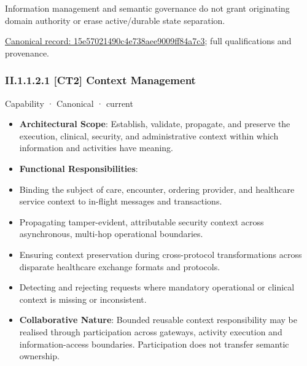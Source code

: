 Information management and semantic governance do not grant originating domain authority or erase active/durable state separation.


{\footnotesize \href{../../../../continuum/strategy/capability/15e57021490c4e738aee9009ff84a7c3.md}{Canonical record: 15e57021490c4e738aee9009ff84a7c3}; full qualifications and provenance.}\par
\subsubsection*{II.1.1.2.1 [CT2] Context Management}
\label{navigation:II.1.1.2.1}

\label{element:3cfd3e56c23a4943bd1b476ec248ac49}
{\small Capability · Canonical · current}\par

\begin{itemize}


\item \textbf{Architectural Scope}: Establish, validate, propagate, and preserve the execution, clinical, security, and administrative context within which information and activities have meaning.

\item \textbf{Functional Responsibilities}:

\item Binding the subject of care, encounter, ordering provider, and healthcare service context to in-flight messages and transactions.

\item Propagating tamper-evident, attributable security context across asynchronous, multi-hop operational boundaries.

\item Ensuring context preservation during cross-protocol transformations across disparate healthcare exchange formats and protocols.

\item Detecting and rejecting requests where mandatory operational or clinical context is missing or inconsistent.

\item \textbf{Collaborative Nature}: Bounded reusable context responsibility may be realised through participation across gateways, activity execution and information-access boundaries. Participation does not transfer semantic ownership.

\end{itemize}


